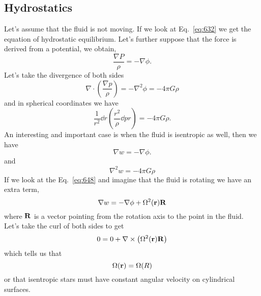 \subsection{Hydrostatics}
\label{sec:hydrostatics}
Let's assume that the fluid is not moving.  If we look at Eq.~\ref{eq:632} we
get the equation of hydrostatic equilibrium.  Let's further suppose
that the force is derived from a potential, we obtain,
\begin{equation}
\frac{\nabla P}{\rho} = - \nabla \phi.
\label{eq:644}
\end{equation}
Let's take the divergence of both sides
\begin{equation}
\nabla \cdot \left ( \frac{\nabla p}{\rho} \right ) = -\nabla^2 \phi
= -4\pi G \rho
\label{eq:645}
\end{equation}
and in spherical coordinates we have
\begin{equation}
\frac{1}{r^2} \dd{}{r} \left ( \frac{r^2}{\rho} \dd{p}{r} \right ) =
-4\pi G \rho.
\label{eq:646}
\end{equation}
An interesting and important case is when the fluid is isentropic as
well, then we have
\begin{equation}
\nabla w = -\nabla \phi.
\label{eq:647}
\end{equation}
and
\begin{equation}
\nabla^2 w = -4\pi G \rho
\label{eq:648}
\end{equation}
If we look at the Eq.~\ref{eq:648} and imagine that the fluid is rotating we
have an extra term,
\begin{equation}
\nabla w = -\nabla \phi + \Omega^2({\bf r}) {\bf R}
\label{eq:649}
\end{equation}
where ${\bf R}$ is a vector pointing from the rotation axis to 
the point in the fluid.  Let's take the curl of both sides to get
\begin{equation}
0 = 0 + \nabla \times \left ( \Omega^2({\bf r}) {\bf R} \right )
\label{eq:650}
\end{equation}
which tells us that
\begin{equation}
\Omega ( {\bf r} ) = \Omega(R)
\label{eq:651}
\end{equation}
or that isentropic stars must have constant angular velocity on
cylindrical surfaces.

